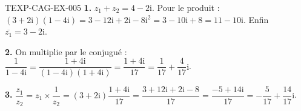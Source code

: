 \begin{corrige}{TEXP-CAG-EX-005}
\textbf{1.} $z_1+z_2=4-2\mathrm{i}$. Pour le produit :
$(3+2\mathrm{i})(1-4\mathrm{i})=3-12\mathrm{i}+2\mathrm{i}-8\mathrm{i}^2
=3-10\mathrm{i}+8=11-10\mathrm{i}$. Enfin
$\overline{z_1}=3-2\mathrm{i}$.

\textbf{2.} On multiplie par le conjugué :
$\dfrac{1}{1-4\mathrm{i}}=\dfrac{1+4\mathrm{i}}{(1-4\mathrm{i})(1+4\mathrm{i})}
=\dfrac{1+4\mathrm{i}}{17}=\dfrac{1}{17}+\dfrac{4}{17}\mathrm{i}$.

\textbf{3.} $\dfrac{z_1}{z_2}=z_1\times\dfrac{1}{z_2}
=(3+2\mathrm{i})\dfrac{1+4\mathrm{i}}{17}
=\dfrac{3+12\mathrm{i}+2\mathrm{i}-8}{17}
=\dfrac{-5+14\mathrm{i}}{17}=-\dfrac{5}{17}+\dfrac{14}{17}\mathrm{i}$.
\end{corrige}
